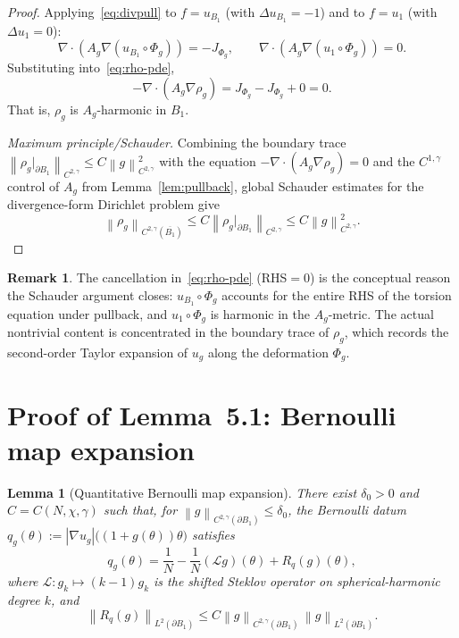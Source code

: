 \documentclass[11pt]{article}
\newtheorem{lemma}[theorem]{Lemma}
\theoremstyle{definition}
\newtheorem{remark}[theorem]{Remark}
\newcommand{\norm}[1]{\left\|#1\right\|}
\newcommand{\abs}[1]{\left|#1\right|}
\begin{document}
\begin{proof}
Applying~\eqref{eq:divpull} to $f=u_{B_1}$ (with $\Delta u_{B_1}=-1$) and to
$f=u_1$ (with $\Delta u_1=0$):
\[
\nabla\cdot(A_g\nabla(u_{B_1}\circ\Phi_g))=-J_{\Phi_g},\qquad
\nabla\cdot(A_g\nabla(u_1\circ\Phi_g))=0.
\]
Substituting into~\eqref{eq:rho-pde},
\[
-\nabla\cdot(A_g\nabla\rho_g)
=J_{\Phi_g}-J_{\Phi_g}+0=0.
\]
That is, $\rho_g$ is $A_g$-harmonic in $B_1$.

\emph{Maximum principle/Schauder.} Combining the boundary trace
$\norm{\rho_g\big|_{\partial B_1}}_{C^{2,\gamma}}\le C\norm{g}_{C^{2,\gamma}}^2$
with the equation $-\nabla\cdot(A_g\nabla\rho_g)=0$ and the $C^{1,\gamma}$
control of $A_g$ from Lemma~\ref{lem:pullback}, global Schauder estimates for
the divergence-form Dirichlet problem give
\[
\norm{\rho_g}_{C^{2,\gamma}(\overline{B_1})}
\le C\norm{\rho_g\big|_{\partial B_1}}_{C^{2,\gamma}}
\le C\norm{g}_{C^{2,\gamma}}^2.
\]
\end{proof}

\begin{remark}
The cancellation in~\eqref{eq:rho-pde} (RHS$=0$) is the conceptual reason the
Schauder argument closes: $u_{B_1}\circ\Phi_g$ accounts for the entire RHS of
the torsion equation under pullback, and $u_1\circ\Phi_g$ is harmonic in the
$A_g$-metric. The actual nontrivial content is concentrated in the boundary
trace of $\rho_g$, which records the second-order Taylor expansion of $u_g$
along the deformation $\Phi_g$.
\end{remark}

\section{Proof of Lemma~5.1: Bernoulli map expansion}\label{sec:lem51}

\begin{lemma}[Quantitative Bernoulli map expansion]\label{lem:5.1}
There exist $\delta_0>0$ and $C=C(N,\chi,\gamma)$ such that, for
$\norm{g}_{C^{2,\gamma}(\partial B_1)}\le\delta_0$, the Bernoulli datum
$q_g(\theta):=\abs{\nabla u_g}\bigl((1+g(\theta))\theta\bigr)$ satisfies
\[
q_g(\theta)=\frac{1}{N}-\frac{1}{N}(\mathcal Lg)(\theta)+R_q(g)(\theta),
\]
where $\mathcal L:g_k\mapsto(k-1)g_k$ is the shifted Steklov operator on
spherical-harmonic degree $k$, and
\[
\norm{R_q(g)}_{L^2(\partial B_1)}
\le C\norm{g}_{C^{2,\gamma}(\partial B_1)}\,\norm{g}_{L^2(\partial B_1)}.
\]
\end{lemma}
\end{document}
